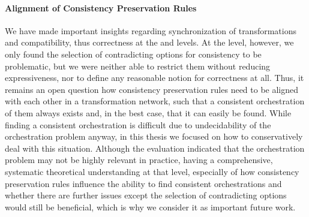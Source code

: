 
\paragraph{Alignment of Consistency Preservation Rules}
We have made important insights regarding synchronization of transformations and compatibility, thus correctness at the \leveltransformation and \levelnetworkrelation levels.
At the \levelnetworkrule level, however, we only found the selection of contradicting options for consistency to be problematic, but we were neither able to restrict them without reducing expressiveness, nor to define any reasonable notion for correctness at all.
Thus, it remains an open question how consistency preservation rules need to be aligned with each other in a transformation network, such that a consistent orchestration of them always exists and, in the best case, that it can easily be found.
While finding a consistent orchestration is difficult due to undecidability of the orchestration problem anyway, in this thesis we focused on how to conservatively deal with this situation.
Although the evaluation indicated that the orchestration problem may not be highly relevant in practice, having a comprehensive, systematic theoretical understanding at that level, especially of how consistency preservation rules influence the ability to find consistent orchestrations and whether there are further issues except the selection of contradicting options would still be beneficial, which is why we consider it as important future work.

